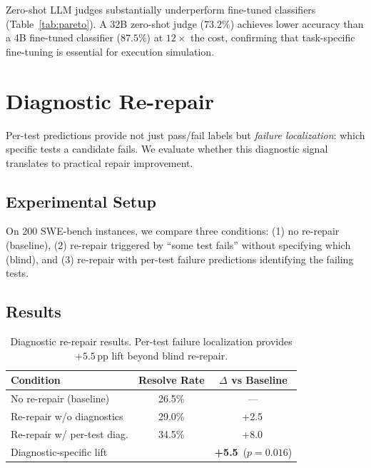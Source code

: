 \documentclass[11pt,a4paper]{article}
\newcommand{\pp}{\,\text{pp}}
\begin{document}
Zero-shot LLM judges substantially underperform fine-tuned classifiers (Table~\ref{tab:pareto}).
A 32B zero-shot judge ($73.2\%$) achieves lower accuracy than a 4B fine-tuned classifier ($87.5\%$) at $12{\times}$ the cost, confirming that task-specific fine-tuning is essential for execution simulation.

\section{Diagnostic Re-repair}
\label{sec:rerepair}

Per-test predictions provide not just pass/fail labels but \emph{failure localization}: which specific tests a candidate fails.
We evaluate whether this diagnostic signal translates to practical repair improvement.

\subsection{Experimental Setup}

On 200 SWE-bench instances, we compare three conditions: (1) no re-repair (baseline), (2) re-repair triggered by ``some test fails'' without specifying which (blind), and (3) re-repair with per-test failure predictions identifying the failing tests.

\subsection{Results}

\begin{table}[t]
\centering
\small
\begin{tabular}{lcc}
\toprule
\textbf{Condition} & \textbf{Resolve Rate} & \textbf{$\Delta$ vs Baseline} \\
\midrule
No re-repair (baseline) & 26.5\% & --- \\
Re-repair w/o diagnostics & 29.0\% & +2.5\pp \\
Re-repair w/ per-test diag. & 34.5\% & +8.0\pp \\
\midrule
Diagnostic-specific lift & & \textbf{+5.5\pp} ($p{=}0.016$) \\
\bottomrule
\end{tabular}
\caption{Diagnostic re-repair results. Per-test failure localization provides $+5.5\pp$ lift beyond blind re-repair.}
\label{tab:rerepair}
\end{table}
\end{document}
